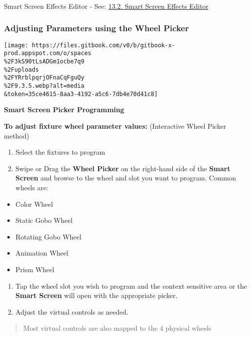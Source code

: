 \documentclass[
]{article}
\begin{document}
Smart Screen Effects Editor - See: \href{https://vibemanual.compulite.com/effects-1.html\#smart-screen-effects-editor}{13.2. Smart Screen Effects Editor}

\hypertarget{adjusting-parameters-using-the-wheel-picker}{%
\subsubsection{Adjusting Parameters using the Wheel Picker}\label{adjusting-parameters-using-the-wheel-picker}}

\texttt{[image: https://files.gitbook.com/v0/b/gitbook-x-prod.appspot.com/o/spaces\\\%2F3kS90tLsADGm1ocbe7q9\\\%2Fuploads\\\%2FYRrblpqrjOFnaCqFguQy\\\%2F9.3.5.webp?alt=media\\\&token=35ce4615-8aa3-4192-a5c6-7db4e70d41c8]}

\textbf{Smart Screen Picker Programming}

\textbf{To adjust fixture wheel parameter values:} (Interactive Wheel Picker method)

\begin{enumerate}
\def\labelenumi{\arabic{enumi}.}
\item
  Select the fixtures to program
\item
  Swipe or Drag the \textbf{Wheel Picker} on the right-hand side of the \textbf{Smart Screen} and browse to the wheel and slot you want to program. Common wheels are:
\end{enumerate}

\begin{itemize}
\item
  Color Wheel
\item
  Static Gobo Wheel
\item
  Rotating Gobo Wheel
\item
  Animation Wheel
\item
  Prism Wheel
\end{itemize}

\begin{enumerate}
\def\labelenumi{\arabic{enumi}.}
\setcounter{enumi}{2}
\item
  Tap the wheel slot you wish to program and the context sensitive area or the \textbf{Smart Screen} will open with the appropriate picker.
\item
  Adjust the virtual controls as needed.
\end{enumerate}

\begin{quote}
Most virtual controls are also mapped to the 4 physical wheels
\end{quote}
\end{document}

